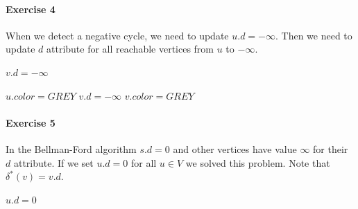 \documentclass{book}
\begin{document}
	\paragraph{Exercise 4}
	When we detect a negative cycle, we need to update $u.d = -\infty$. Then we need to update $d$ attribute for all reachable vertices from $u$ to $-\infty$.
	\begin{algorithm*}[h!]
		\begin{algorithmic}[1]
				\State {}
						\State {}
					\EndFor
				\EndFor
				\State {}
						\State $v.d = -\infty$
						\State {}
					\EndIf
				\EndFor
			\EndFunction
		\end{algorithmic}
	\end{algorithm*}
	\begin{algorithm*}[h!]
		\begin{algorithmic}[1]
				\State $u.color = GREY$
						\State $v.d = -\infty$
						\State $v.color = GREY$
						\State {}
					\EndIf
				\EndFor
			\EndFunction
		\end{algorithmic}
	\end{algorithm*}
	\FloatBarrier
	\paragraph{Exercise 5}
	In the Bellman-Ford algorithm $s.d = 0$ and other vertices have value $\infty$ for their $d$ attribute. If we set $u.d = 0$ for all $u \in V$ we solved this problem. Note that $\delta^*(v) = v.d$.
	\begin{algorithm*}[h!]
		\begin{algorithmic}[1]
				\State {}
					\State $u.d = 0$
				\EndFor
						\State {}
					\EndFor
				\EndFor
			\EndFunction
		\end{algorithmic}
	\end{algorithm*}	
	\FloatBarrier
\end{document}
